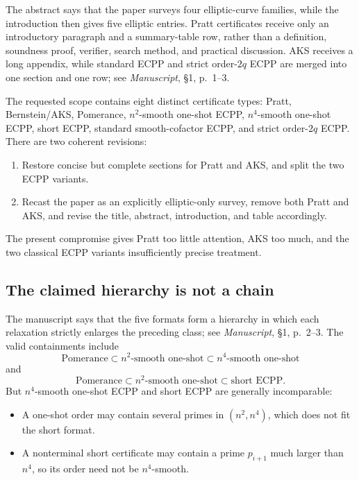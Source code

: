 \documentclass[11pt]{amsart}
\newcommand{\sourceat}[2]{\emph{Manuscript}, \S#1, p.~#2}
\begin{document}
The abstract says that the paper surveys four elliptic-curve families, while the introduction then gives five elliptic entries.  Pratt certificates receive only an introductory paragraph and a summary-table row, rather than a definition, soundness proof, verifier, search method, and practical discussion.  AKS receives a long appendix, while standard ECPP and strict order-$2q$ ECPP are merged into one section and one row; see \sourceat{1}{1--3}.

The requested scope contains eight distinct certificate types: Pratt, Bernstein/AKS, Pomerance, $n^2$-smooth one-shot ECPP, $n^4$-smooth one-shot ECPP, short ECPP, standard smooth-cofactor ECPP, and strict order-$2q$ ECPP.  There are two coherent revisions:

\begin{enumerate}
\item Restore concise but complete sections for Pratt and AKS, and split the two ECPP variants.
\item Recast the paper as an explicitly elliptic-only survey, remove both Pratt and AKS, and revise the title, abstract, introduction, and table accordingly.
\end{enumerate}

The present compromise gives Pratt too little attention, AKS too much, and the two classical ECPP variants insufficiently precise treatment.

\subsection{The claimed hierarchy is not a chain}

The manuscript says that the five formats form a hierarchy in which each relaxation strictly enlarges the preceding class; see \sourceat{1}{2--3}.  The valid containments include
\[
 \text{Pomerance}
 \subset
 n^2\text{-smooth one-shot}
 \subset
 n^4\text{-smooth one-shot}
\]
and
\[
 \text{Pomerance}
 \subset
 n^2\text{-smooth one-shot}
 \subset
 \text{short ECPP}.
\]
But $n^4$-smooth one-shot ECPP and short ECPP are generally incomparable:

\begin{itemize}
\item A one-shot order may contain several primes in $(n^2,n^4)$, which does not fit the short format.
\item A nonterminal short certificate may contain a prime $p_{i+1}$ much larger than $n^4$, so its order need not be $n^4$-smooth.
\end{itemize}
\end{document}
